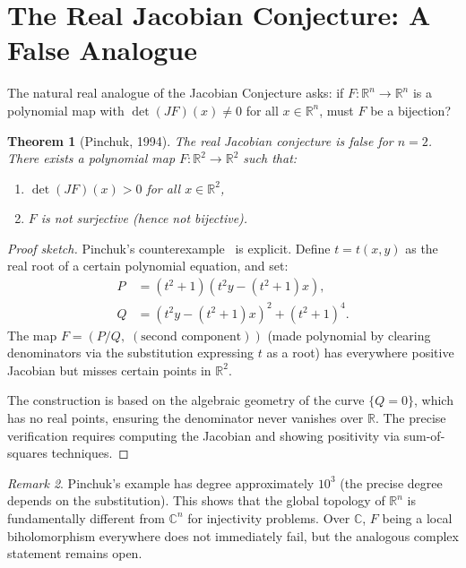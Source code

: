 \documentclass[12pt,a4paper]{amsart}
\newtheorem{theorem}{Theorem}[section]
\theoremstyle{definition}
\theoremstyle{remark}
\newtheorem{remark}[theorem]{Remark}
\begin{document}
\section{The Real Jacobian Conjecture: A False Analogue}
\label{sec:real}

The natural real analogue of the Jacobian Conjecture asks: if
$F \colon \mathbb{R}^n \to \mathbb{R}^n$ is a polynomial map with $\det(JF)(x) \neq 0$
for all $x \in \mathbb{R}^n$, must $F$ be a bijection?

\begin{theorem}[Pinchuk, 1994]\label{thm:pinchuk}
The real Jacobian conjecture is \emph{false} for $n = 2$. There exists a polynomial
map $F \colon \mathbb{R}^2 \to \mathbb{R}^2$ such that:
\begin{enumerate}[label=(\roman*)]
  \item $\det(JF)(x) > 0$ for all $x \in \mathbb{R}^2$,
  \item $F$ is not surjective (hence not bijective).
\end{enumerate}
\end{theorem}

\begin{proof}[Proof sketch]
Pinchuk's counterexample~\cite{Pin94} is explicit. Define $t = t(x,y)$ as the
real root of a certain polynomial equation, and set:
\begin{align*}
  P &= (t^2 + 1)(t^2 y - (t^2+1)x),\\
  Q &= (t^2 y - (t^2+1)x)^2 + (t^2+1)^4.
\end{align*}
The map $F = (P/Q,\; (\text{second component}))$ (made polynomial by clearing
denominators via the substitution expressing $t$ as a root) has everywhere positive
Jacobian but misses certain points in $\mathbb{R}^2$.

The construction is based on the algebraic geometry of the curve $\{Q = 0\}$,
which has no real points, ensuring the denominator never vanishes over $\mathbb{R}$.
The precise verification requires computing the Jacobian and showing positivity
via sum-of-squares techniques.
\end{proof}

\begin{remark}
Pinchuk's example has degree approximately $10^3$ (the precise degree depends on
the substitution). This shows that the global topology of $\mathbb{R}^n$ is
fundamentally different from $\mathbb{C}^n$ for injectivity problems.
Over $\mathbb{C}$, $F$ being a local biholomorphism everywhere does not
immediately fail, but the analogous complex statement remains open.
\end{remark}
\end{document}
